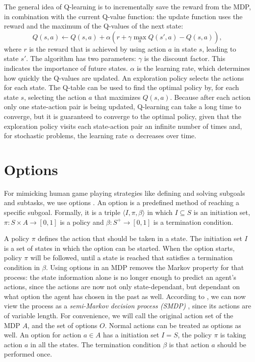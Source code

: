 The general idea of Q-learning is to incrementally save the reward from the MDP,
in combination with the current Q-value function: the update function uses the
reward and the maximum of the Q-values of the next state: 
\begin{equation}
	\label{eq:qlearning}
	Q(s, a) \gets Q(s, a) + \alpha \left(r + \gamma \max_a Q(s', a) - Q(s, a)\right),
\end{equation}
where $r$ is the reward that is achieved by using action $a$ in state $s$,
leading to state $s'$. The algorithm has two parameters: $\gamma$ is the
discount factor. This indicates the importance of future states. $\alpha$ is the
learning rate, which determines how quickly the Q-values are updated. An
exploration policy selects the actions for each state.  The Q-table can be used
to find the optimal policy by, for each state $s$, selecting the action $a$ that
maximizes $Q(s, a)$. Because after each action only one state-action pair is
being updated, Q-learning can take a long time to converge, but it is guaranteed
to converge to the optimal policy, given that the exploration policy visits each
state-action pair an infinite number of times and, for stochastic problems, the
learning rate $\alpha$ decreases over time.

\section{Options}
\label{subsec:options}
For mimicking human game playing strategies like defining and solving subgoals
and subtasks, we use options \cite{sutton1999between, barto2003recent}. An
option is a predefined method of reaching a specific subgoal. Formally, it is a
triple $\langle I, \pi, \beta\rangle$ in which $I \subseteq S$ is an initiation
set, $\pi: S \times A \rightarrow [0, 1]$ is a policy and $\beta: S^+
\rightarrow[0,1]$ is a termination condition.

A policy $\pi$ defines the action that should be taken in a state. The
initiation set $I$ is a set of states in which the option can be started. When the
option starts, policy $\pi$ will be followed, until a state is reached that
satisfies a termination condition in $\beta$. Using options in an MDP removes
the Markov property for that process: the state information alone is no longer
enough to predict an agent's actions, since the actions are now not only
state-dependant, but dependant on what option the agent has chosen in the past
as well. According to \cite{sutton1999between}, we can now view the process as
a \emph{semi-Markov decision process (SMDP)} \cite{duff1995reinforcement},
since its actions are of variable length. For convenience, we will call the
original action set of the MDP $A$, and the set of options $O$.  Normal actions
can be treated as options as well.  An option for action $a \in A$ has a
initiation set $I = S$, the policy $\pi$ is taking action $a$ in all the
states.  The termination condition $\beta$ is that action $a$ should be
performed once.


